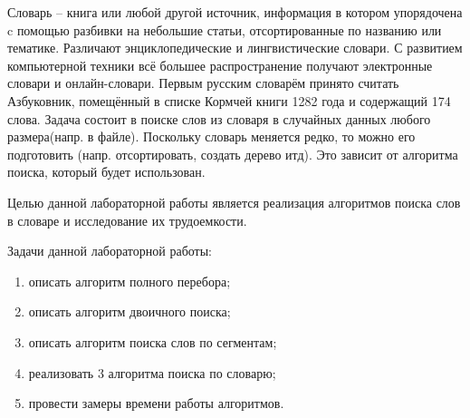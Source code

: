 \Introduction
    Словарь -- книга или любой другой источник,
    информация в котором упорядочена c помощью разбивки на небольшие статьи,
    отсортированные по названию или тематике. 
    Различают энциклопедические и лингвистические словари.
    С развитием компьютерной техники всё большее распространение получают электронные словари и онлайн-словари.
    Первым русским словарём принято считать Азбуковник,
    помещённый в списке Кормчей книги 1282 года и содержащий 174 слова.
    Задача состоит в поиске слов из словаря в случайных данных любого размера(напр. в файле).
    Поскольку словарь меняется редко, то можно его подготовить
    (напр. отсортировать, создать дерево итд). 
    Это зависит от алгоритма поиска, который будет использован. 

    Целью данной лабораторной работы является реализация 
    алгоритмов поиска слов в словаре и исследование их трудоемкости.

    Задачи данной лабораторной работы:
    \begin{enumerate}
        \item описать алгоритм полного перебора;
        \item описать алгоритм двоичного поиска;
        \item описать алгоритм поиска слов по сегментам;
        \item реализовать 3 алгоритма поиска по словарю;
        \item провести замеры времени работы алгоритмов.
    \end{enumerate}

\newpage